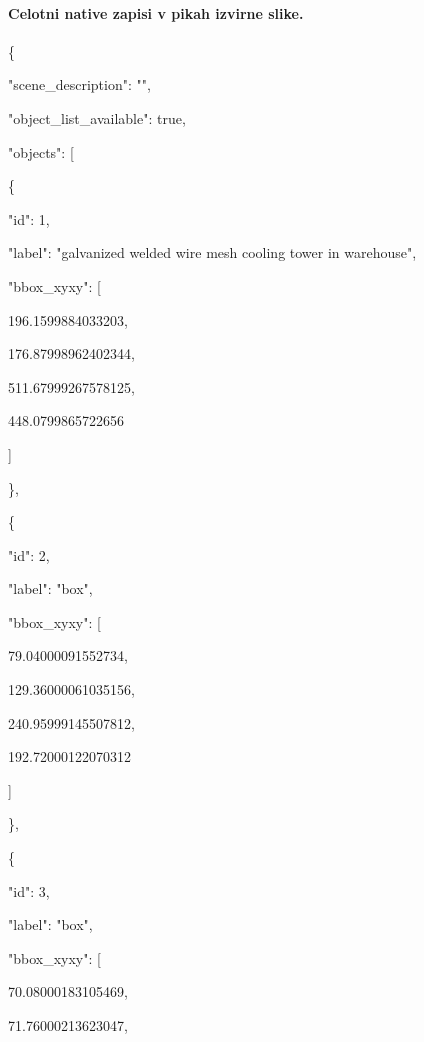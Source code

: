 \documentclass[10pt,a4paper]{article}
\begin{document}
\begin{quote}
\end{quote}
\paragraph{Celotni native zapisi v pikah izvirne slike.}
\{\par
  "scene\_description":\allowbreak{} "",\allowbreak{}\par
  "object\_list\_available":\allowbreak{} true,\allowbreak{}\par
  "objects":\allowbreak{} [\par
    \{\par
      "id":\allowbreak{} 1,\allowbreak{}\par
      "label":\allowbreak{} "galvanized welded wire mesh cooling tower in warehouse",\allowbreak{}\par
      "bbox\_xyxy":\allowbreak{} [\par
        196.1599884033203,\allowbreak{}\par
        176.87998962402344,\allowbreak{}\par
        511.67999267578125,\allowbreak{}\par
        448.0799865722656\par
      ]\par
    \},\allowbreak{}\par
    \{\par
      "id":\allowbreak{} 2,\allowbreak{}\par
      "label":\allowbreak{} "box",\allowbreak{}\par
      "bbox\_xyxy":\allowbreak{} [\par
        79.04000091552734,\allowbreak{}\par
        129.36000061035156,\allowbreak{}\par
        240.95999145507812,\allowbreak{}\par
        192.72000122070312\par
      ]\par
    \},\allowbreak{}\par
    \{\par
      "id":\allowbreak{} 3,\allowbreak{}\par
      "label":\allowbreak{} "box",\allowbreak{}\par
      "bbox\_xyxy":\allowbreak{} [\par
        70.08000183105469,\allowbreak{}\par
        71.76000213623047,\allowbreak{}\par
\end{document}
